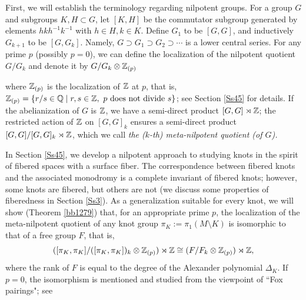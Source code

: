\documentclass{article}
\theoremstyle{plain}
\theoremstyle{definition}
\newcommand{\Q}{{\Bbb Q}}
\newcommand{\Z}{{\Bbb Z}}
\begin{document}
First, we will establish the terminology regarding nilpotent groups. For a group $G$ and subgroups $K,H \subset G$, let $[K,H]$ be the commutator subgroup generated by elements $hkh^{-1}k^{-1}$ with $h \in H, k\in K$. Define $G_1$ to be $[G,G]$, and inductively $G_{k+1} $ to be $[G,G_k]$. Namely, $G \supset G_1 \supset G_2 \supset \cdots $ is a lower central series. For any prime $p$ (possibly $p=0$), we can define the localization of the nilpotent quotient $G/G_k$ and denote it by $G/G_k\otimes \Z_{(p)} $ {where $\Z_{(p)}$ is the localization of $\Z$ at $p$, that is, $\Z_{(p)}=\{ r/s \in \Q \mid r,s \in \Z,\ p \textrm{ does not divide }s \}$; see Section \ref{Ss45} for details. If the abelianization of $G$ is $\Z$, we have a semi-direct product $[G,G] \rtimes \Z$; the restricted action of $\Z$ on $[G,G]_k$ ensures a semi-direct product $ [G,G]/[G,G]_k \rtimes \Z$, which we call {\it the ($k$-th) meta-nilpotent quotient (of $G$).}


In Section \ref{Ss45}, we develop a nilpotent approach to studying knots in the spirit of fibered spaces with a surface fiber. The correspondence between fibered knots and the associated monodromy is a complete invariant of fibered knots; however, some knots are fibered, but others are not (we discuss some properties of fiberedness in Section \ref{Ss3}). As a generalization suitable for every knot, we will show (Theorem \ref{bb1279}) that, for an appropriate prime $p$, the localization of the meta-nilpotent quotient of any knot group $\pi_K:= \pi_1(M \setminus K) $ is isomorphic to that of a free group $F$, that is,
$$ ([\pi_K,\pi_K]/([\pi_K,\pi_K])_k \otimes \Z_{(p)}) \rtimes \Z \cong (F/F_k \otimes \Z_{(p)}) \rtimes \Z,$$
where the rank of $F$ is equal to the degree of the Alexander polynomial $\Delta_K$.
If $p=0$, the isomorphism is mentioned and studied from the viewpoint of ``Fox pairings"; see \cite{Tur2}

}
\end{document}
